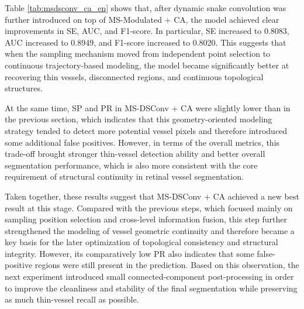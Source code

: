 \documentclass[a4paper,12pt]{article}
\begin{document}
\begin{table}[htbp]
\centering
\caption{Comparison of experiments with MS-Modulated + CA and MS-DSConv + CA}
\label{tab:msdsconv_ca_en}
\end{table}

Table \ref{tab:msdsconv_ca_en} shows that, after dynamic snake convolution was further introduced on top of MS-Modulated + CA, the model achieved clear improvements in SE, AUC, and F1-score. In particular, SE increased to 0.8083, AUC increased to 0.8949, and F1-score increased to 0.8020. This suggests that when the sampling mechanism moved from independent point selection to continuous trajectory-based modeling, the model became significantly better at recovering thin vessels, disconnected regions, and continuous topological structures.

At the same time, SP and PR in MS-DSConv + CA were slightly lower than in the previous section, which indicates that this geometry-oriented modeling strategy tended to detect more potential vessel pixels and therefore introduced some additional false positives. However, in terms of the overall metrics, this trade-off brought stronger thin-vessel detection ability and better overall segmentation performance, which is also more consistent with the core requirement of structural continuity in retinal vessel segmentation.

Taken together, these results suggest that MS-DSConv + CA achieved a new best result at this stage. Compared with the previous steps, which focused mainly on sampling position selection and cross-level information fusion, this step further strengthened the modeling of vessel geometric continuity and therefore became a key basis for the later optimization of topological consistency and structural integrity. However, its comparatively low PR also indicates that some false-positive regions were still present in the prediction. Based on this observation, the next experiment introduced small connected-component post-processing in order to improve the cleanliness and stability of the final segmentation while preserving as much thin-vessel recall as possible.
\end{document}
